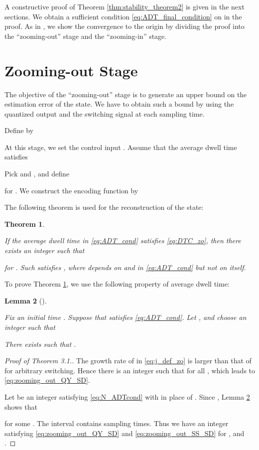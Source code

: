 \documentclass[letterpaper, 11pt, onecolumn]{ieeeconf}  \IEEEoverridecommandlockouts
\newtheorem{theorem}{Theorem}[section]
\newtheorem{lemma}[theorem]{Lemma}
\begin{document}
A constructive proof of Theorem \ref{thm:stability_theorem2} is given 
in the next sections.
We obtain a sufficient condition \eqref{eq:ADT_final_condition} on 
in the proof.
As in \cite{Liberzon2003, WakaikiMTNS2014, Liberzon2014},
we show the convergence to the origin 
by dividing the proof into the ``zooming-out'' stage and
the ``zooming-in'' stage. 



\section{Zooming-out Stage}


The objective of the ``zooming-out'' stage is to generate 
an upper bound on the estimation error of the state.
We have to obtain such a bound by using the quantized output
and the switching signal at each sampling time.

Define  by




At this stage, we set the control input .
Assume that the average dwell time  satisfies


Pick  and , and define

for . We construct the encoding function  by 

The following theorem is used 
for the reconstruction of the state:
\begin{theorem}
\label{prop:property_of_ADT}
{\em
If the average dwell time  in \eqref{eq:ADT_cond} 
satisfies \eqref{eq:DTC_zo}, then
there exists an integer  such that

for . 
Such  satisfies , where
 depends on  and  in \eqref{eq:ADT_cond}
but not on  itself.
}
\end{theorem}

To prove Theorem \ref{prop:property_of_ADT}, 
we use the following property of average dwell time:
\begin{lemma}[\cite{WakaikiMTNS2014}]
\label{lem:ADT_upperbound}
{\em
Fix an initial time .
Suppose that  satisfies \eqref{eq:ADT_cond}.
Let , and choose an integer  such that

There exists  such that 
.
}
\end{lemma}



\begin{proof}[Proof of Theorem 3.1.]
The growth rate of  in \eqref{eq:j_def_zo} is 
larger than that of  for arbitrary switching. Hence
there is an integer  such that 
for all , which leads to \eqref{eq:zooming_out_QY_SD}.

Let  be an integer satisfying \eqref{eq:N_ADTcond} with 
 in place of .
Since ,
Lemma \ref{lem:ADT_upperbound} shows that

for some .
The interval  contains  sampling times. Thus
we have an integer  satisfying
\eqref{eq:zooming_out_QY_SD} and \eqref{eq:zooming_out_SS_SD}
for , and .
\end{proof}
\end{document}
